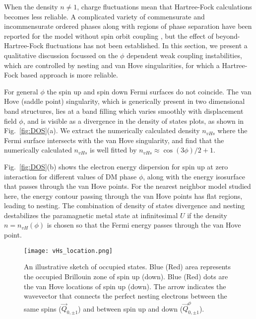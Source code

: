 \documentclass[%
reprint,
superscriptaddress,
twocolumn,
 amsmath,amssymb,
 aps,
 prb,
]{revtex4-2}
\begin{document}

When the density $n\neq 1$, charge fluctuations mean that Hartree-Fock calculations becomes less reliable. A complicated variety of commensurate and incommensurate ordered phases along with regions of phase separation have been reported for the model without spin orbit coupling \cite{HF_all_filling,pasrija2016noncollinear}, but the effect of beyond-Hartree-Fock fluctuations has not been established. In this section, we present a qualitative discussion focussed  on the $\phi$ dependent weak coupling instabilities, which are controlled by nesting and van Hove singularities, for which a Hartree-Fock based approach is more reliable.

For general $\phi$  the spin up and spin down Fermi surfaces do not coincide. The van Hove (saddle point) singularity, which is generically present in two dimensional band structures, lies at a band filling which varies smoothly with displacement field $\phi$, and is visible as a divergence in the density of states plots, as shown in Fig.~\ref{fig:DOS}(a). We extract the numerically calculated density $n_{vHs}$ where the Fermi surface intersects with the van Hove singularity, and find that the numerically calculated $n_{vHs}$ is well fitted by $n_{vHs}\approx\cos(3\phi)/2+1$.

Fig.~\ref{fig:DOS}(b) shows the electron energy dispersion for spin up at zero interaction for different values of DM phase $\phi$, along with the energy isosurface that passes through the van Hove points. For the nearest neighbor model studied here, the energy contour passing through the van Hove points has flat regions, leading to nesting. The combination of density of states divergence and nesting destabilizes the paramagnetic metal  state at infinitesimal $U$ if the density $n=n_{vH}(\phi)$ is chosen so that the Fermi energy passes through the van Hove point.

\begin{figure}[htbp]
  \texttt{[image: vHs\_location.png]}
  \caption{An illustrative sketch of occupied states. Blue (Red) area represents the occupied Brillouin zone of spin up (down). Blue (Red) dots are the van Hove locations of spin up (down). The arrow indicates the wavevector that connects the perfect nesting electrons between the same spins ($\vec{Q}_{0,\pm 1}$) and between spin up and down ($\vec{Q}^\phi_{0,\pm 1}$).}
  \label{fig:vHs_location}
\end{figure}
\end{document}
